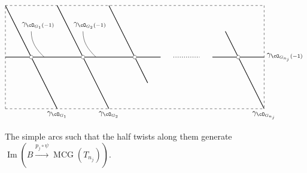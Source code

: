 \documentclass{amsart}
\numberwithin{equation}{section}
\theoremstyle{plain}
\theoremstyle{definition}
\DeclareMathOperator{\MCG}{\mathrm{MCG}}
\DeclareMathOperator{\Image}{\mathrm{Im}}
\begin{document}
\begin{figure}[h]
    \centering
    \begin{displaymath}
        \begin{tikzpicture}[scale=1.2]
            \draw[dashed] (0,0)--(10,0);
            \draw[dashed] (0,0)--(0,4);
            \draw[dashed] (0,4)--(10,4);
            \draw[dashed] (10,4)--(10,0);

            \draw[thick] (0, 2)--(1, 2);
            \draw[thick] (1, 2)--(3, 2);
            \draw[thick] (3, 2)--(5, 2);
            \draw[thick] (5, 2)--(6, 2);
            \draw[thick] (8, 2)--(9, 2);
            \draw[thick] (9, 2)--(10, 2);


            \draw[thick] (0, 4)--(1, 2);
            \draw[thick] (1, 2)--(2, 0);
            \draw[thick] (2, 4)--(4, 0);
            \draw[thick] (4, 4)--(5, 2);
            \draw[thick] (5, 2)--(5.5, 1);
            \draw[thick] (8.5, 3)--(9, 2);
            \draw[thick] (9, 2)--(10, 0);

            \draw[dotted, thick] (5+1.5, 2)--(9-1.5, 2);
            \foreach \u in {1, 3, 5, 9}
                {
                    \filldraw[white] (\u, 2) circle (2pt);
                    \draw[black] (\u, 2) circle (2pt);
                }

            \draw(2, 0) node[below]{$\gamma_{\cO_{G_1}}$};
            \draw(4, 0) node[below]{$\gamma_{\cO_{G_2}}$};
            \draw(10, 0) node[below]{$\gamma_{\cO_{G_{n_j}}}$};

            \draw(2, 3) node[above left]{$\gamma_{\cO_{G_1}(-1)}$};
            \draw(1, 3) to[out=-90,in=135](1.5, 2);
            \draw(4, 3) node[above left]{$\gamma_{\cO_{G_2}(-1)}$};
            \draw(3, 3) to[out=-90,in=135](3.5, 2);

            \draw(10, 2) node[right]{$\gamma_{\cO_{G_{n_j}}(-1)}$};

        \end{tikzpicture}
    \end{displaymath}
    \caption{The simple arcs such that the half twists along them generate $\Image(B \xrightarrow{p_j \circ \psi} \MCG(T_{n_j}))$.} \label{fig:generators-for-image-of-B}
\end{figure}
\end{document}
